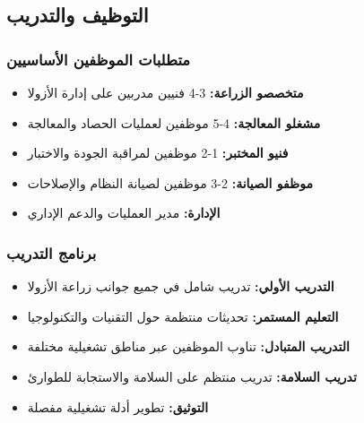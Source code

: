 \subsection{التوظيف والتدريب}

\subsubsection{متطلبات الموظفين الأساسيين}
\begin{itemize}
    \item \textbf{متخصصو الزراعة:} 3-4 فنيين مدربين على إدارة الأزولا
    \item \textbf{مشغلو المعالجة:} 4-5 موظفين لعمليات الحصاد والمعالجة
    \item \textbf{فنيو المختبر:} 1-2 موظفين لمراقبة الجودة والاختبار
    \item \textbf{موظفو الصيانة:} 2-3 موظفين لصيانة النظام والإصلاحات
    \item \textbf{الإدارة:} مدير العمليات والدعم الإداري
\end{itemize}

\subsubsection{برنامج التدريب}
\begin{itemize}
    \item \textbf{التدريب الأولي:} تدريب شامل في جميع جوانب زراعة الأزولا
    \item \textbf{التعليم المستمر:} تحديثات منتظمة حول التقنيات والتكنولوجيا
    \item \textbf{التدريب المتبادل:} تناوب الموظفين عبر مناطق تشغيلية مختلفة
    \item \textbf{تدريب السلامة:} تدريب منتظم على السلامة والاستجابة للطوارئ
    \item \textbf{التوثيق:} تطوير أدلة تشغيلية مفصلة
\end{itemize}
